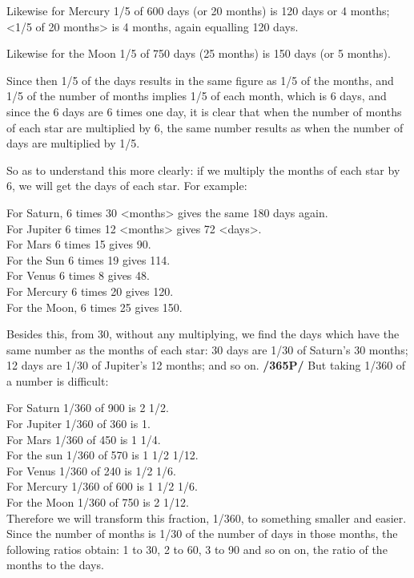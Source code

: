 Likewise for Mercury 1/5 of 600 days (or 20 months) is 120 days or 4 months; <1/5 of 20 months> is 4 months, again equalling 120 days.

Likewise for the Moon 1/5 of 750 days (25 months) is 150 days (or 5 months).

Since then 1/5 of the days results in the same figure as 1/5 of the months, and 1/5 of the number of months implies 1/5 of each month, which is 6 days, and since the 6 days are 6 times one day, it is clear that when the number of months of each star are multiplied by 6, the same number results as when the number of days are multiplied by 1/5.

So as to understand this more clearly: if we multiply the months of each star by 6, we will get the days of each star. For example:

\noindent For Saturn, 6 times 30 <months> gives the same 180 days again.\\
For Jupiter 6 times 12 <months> gives 72 <days>.\\
For Mars 6 times 15 gives 90.\\
For the Sun 6 times 19 gives 114.\\
For Venus 6 times 8 gives 48. \\
For Mercury 6 times 20 gives 120.\\
For the Moon, 6 times 25 gives 150.

Besides this, from 30, without any multiplying, we find the days which have the same number as the months of each star: 30 days are 1/30 of Saturn’s 30 months; 12 days are 1/30 of Jupiter’s 12 months; and so on. \textbf{/365P/} But taking 1/360 of a number is difficult:

\noindent For Saturn 1/360 of 900 is 2 1/2. \\
For Jupiter 1/360 of 360 is 1. \\
For Mars 1/360 of 450 is 1 1/4. \\
For the sun 1/360 of 570 is 1 1/2 1/12. \\
For Venus 1/360 of 240 is 1/2 1/6. \\
For Mercury 1/360 of 600 is 1 1/2 1/6. \\
For the Moon 1/360 of 750 is 2 1/12. \\

Therefore we will transform this fraction, 1/360, to something smaller and easier. Since the number of months is 1/30 of the number of days in those months, the following ratios obtain: 1 to 30, 2 to 60, 3 to 90 and so on on, the ratio of the months to the days. 

